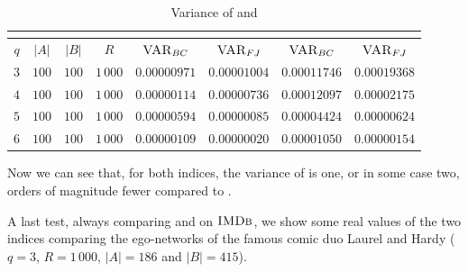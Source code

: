 \begin{table}[h]
	\centering
	\begin{tabular}{|c|c|c|c|c|c|c|c|}
		\cline{5-8}
		\multicolumn{4}{c|}{} & \multicolumn{2}{c|}{\fsamp} & \multicolumn{2}{c|}{\base}\\
		\hline
		$q$ & $|A|$ & $|B|$ & $R$      & $\textsc{VAR}_{BC}$ & $\textsc{VAR}_{FJ}$ & $\textsc{VAR}_{BC}$ & $\textsc{VAR}_{FJ}$ \\ \hline 
		$3$ & $100$ & $100$ & $1\,000$ & $0.00000971$        & $0.00001004$        & $0.00011746$        & $0.00019368$        \\ \hline
		$4$ & $100$ & $100$ & $1\,000$ & $0.00000114$        & $0.00000736$        & $0.00012097$        & $0.00002175$        \\ \hline
		$5$ & $100$ & $100$ & $1\,000$ & $0.00000594$        & $0.00000085$        & $0.00004424$        & $0.00000624$        \\ \hline
		$6$ & $100$ & $100$ & $1\,000$ & $0.00000109$        & $0.00000020$        & $0.00001050$        & $0.00000154$        \\ \hline
	\end{tabular}
	\caption{Variance of \fsamp and \base}	
\end{table}

Now we can see that, for both indices, the variance of \fsamp is one, or in some case two, orders of magnitude fewer compared to \base.

A last test, always comparing \fsamp and \base on $\textsc{IMDb}$, we show some real values of the two indices comparing the ego-networks of the famous comic duo Laurel and Hardy
($q=3$, $R=1\,000$, $|A| = 186$ and $|B| = 415$).


